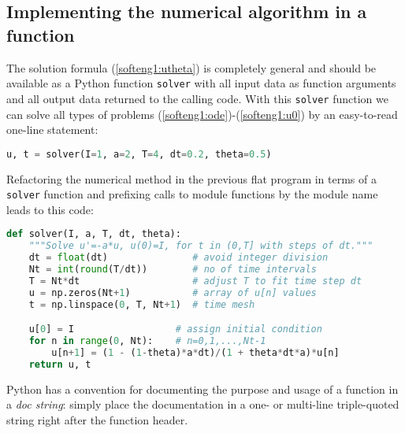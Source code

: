 \documentclass[graybox,sectrefs,envcountresetchap,open=right,final]{svmonodo}
\newenvironment{notice_mdfboxadmon}[1][]{
\begin{notice_mdfboxmdframed}[frametitle=#1]
}
{
\end{notice_mdfboxmdframed}
}
\begin{document}
\subsection{Implementing the numerical algorithm in a function}
\label{softeng1:basic:func}

The solution formula (\ref{softeng1:utheta}) is completely general and
should be available as a Python function \texttt{solver} with all input data as
function arguments and all output data returned to the calling code.
With this \texttt{solver} function we can solve all types of problems
(\ref{softeng1:ode})-(\ref{softeng1:u0})
by an easy-to-read one-line statement:



\begin{lstlisting}[language=python,style=blue1_bluegreen]
u, t = solver(I=1, a=2, T=4, dt=0.2, theta=0.5)

\end{lstlisting}


Refactoring the numerical method in the previous flat program
in terms of a \texttt{solver} function and prefixing calls to
module functions by the module name leads to this code:














\begin{lstlisting}[language=python,style=blue1_bluegreen]
def solver(I, a, T, dt, theta):
    """Solve u'=-a*u, u(0)=I, for t in (0,T] with steps of dt."""
    dt = float(dt)               # avoid integer division
    Nt = int(round(T/dt))        # no of time intervals
    T = Nt*dt                    # adjust T to fit time step dt
    u = np.zeros(Nt+1)           # array of u[n] values
    t = np.linspace(0, T, Nt+1)  # time mesh

    u[0] = I                  # assign initial condition
    for n in range(0, Nt):    # n=0,1,...,Nt-1
        u[n+1] = (1 - (1-theta)*a*dt)/(1 + theta*dt*a)*u[n]
    return u, t

\end{lstlisting}



\begin{notice_mdfboxadmon}
Python has a convention for documenting the purpose and usage of
a function in a \emph{doc string}: simply place the documentation
in a one- or multi-line triple-quoted string right after the
function header.
\end{notice_mdfboxadmon} %
\end{document}
